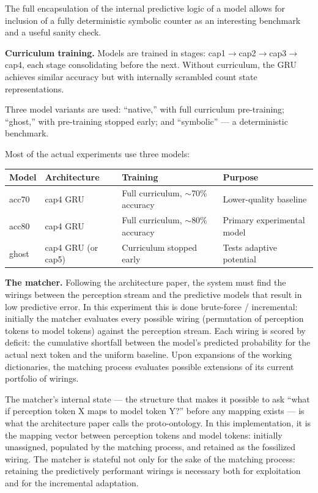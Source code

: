 \documentclass[12pt, a4paper]{article}
\begin{document}
The full encapsulation of the internal predictive logic of a model allows for
inclusion of a fully deterministic symbolic counter as an interesting benchmark
and a useful sanity check.

\textbf{Curriculum training.} Models are trained in stages:
cap1$\to$cap2$\to$cap3$\to$cap4, each stage consolidating before the next.
Without curriculum, the GRU achieves similar accuracy but with internally
scrambled count state representations.

Three model variants are used: ``native,'' with full curriculum pre-training;
``ghost,'' with pre-training stopped early; and ``symbolic'' --- a
deterministic benchmark.

Most of the actual experiments use three models:

\begin{center}
\begin{tabular}{llll}
\toprule
Model & Architecture & Training & Purpose \\
\midrule
acc70 & cap4 GRU & Full curriculum, $\sim$70\% accuracy & Lower-quality baseline \\
acc80 & cap4 GRU & Full curriculum, $\sim$80\% accuracy & Primary experimental model \\
ghost & cap4 GRU (or cap5) & Curriculum stopped early & Tests adaptive potential \\
\bottomrule
\end{tabular}
\end{center}

\textbf{The matcher.} Following the architecture paper, the system must find
the wirings between the perception stream and the predictive models that result
in low predictive error. In this experiment this is done brute-force /
incremental: initially the matcher evaluates every possible wiring (permutation
of perception tokens to model tokens) against the perception stream. Each
wiring is scored by deficit: the cumulative shortfall between the model's
predicted probability for the actual next token and the uniform baseline. Upon
expansions of the working dictionaries, the matching process evaluates possible
extensions of its current portfolio of wirings.

The matcher's internal state --- the structure that makes it possible to ask
``what if perception token X maps to model token Y?'' before any mapping
exists --- is what the architecture paper calls the proto-ontology. In this
implementation, it is the mapping vector between perception tokens and model
tokens: initially unassigned, populated by the matching process, and retained
as the fossilized wiring. The matcher is stateful not only for the sake of the
matching process: retaining the predictively performant wirings is necessary
both for exploitation and for the incremental adaptation.
\end{document}
